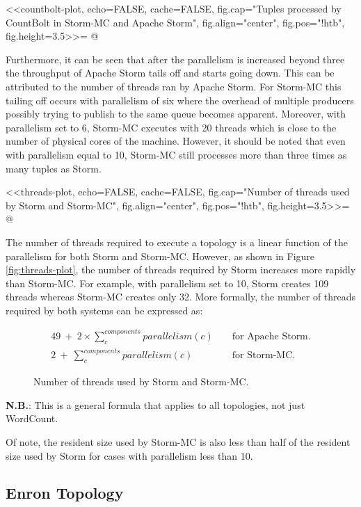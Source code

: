 <<countbolt-plot, echo=FALSE, cache=FALSE, fig.cap="Tuples processed by CountBolt in Storm-MC and Apache Storm", fig.align="center", fig.pos="!htb", fig.height=3.5>>=
@

Furthermore, it can be seen that after the parallelism is increased beyond three the throughput of Apache Storm tails off and starts going down. This can be attributed to the number of threads ran by Apache Storm. For Storm-MC this tailing off occurs with parallelism of six where the overhead of multiple producers possibly trying to publish to the same queue becomes apparent. Moreover, with parallelism set to 6, Storm-MC executes with 20 threads which is close to the number of physical cores of the machine. However, it should be noted that even with parallelism equal to 10, Storm-MC still processes more than three times as many tuples as Storm.

<<threads-plot, echo=FALSE, cache=FALSE, fig.cap="Number of threads used by Storm and Storm-MC", fig.align="center", fig.pos="!htb", fig.height=3.5>>=
@

The number of threads required to execute a topology is a linear function of the parallelism for both Storm and Storm-MC. However, as shown in Figure \ref{fig:threads-plot}, the number of threads required by Storm increases more rapidly than Storm-MC. For example, with parallelism set to 10, Storm creates 109 threads whereas Storm-MC creates only 32. More formally, the number of threads required by both systems can be expressed as:

\begin{figure}[!htb]
\begin{eqnarray*}
	49 \ + \ 2 \times \sum\limits_{c}^{components} parallelism(c) && \text{ for Apache Storm.} \\
	2 \ + \ \sum\limits_{c}^{components} parallelism(c) && \text{ for Storm-MC.}
\end{eqnarray*}
\caption{Number of threads used by Storm and Storm-MC.}
\end{figure}

\textbf{N.B.}\@\xspace: This is a general formula that applies to all topologies, not just WordCount.

Of note, the resident size used by Storm-MC is also less than half of the resident size used by Storm for cases with parallelism less than 10.

\subsection{Enron Topology}

